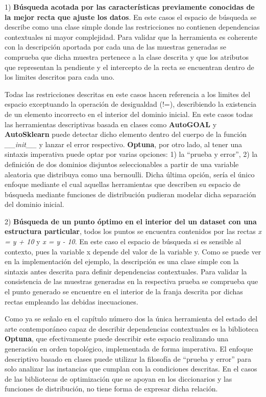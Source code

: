 1) {\bf Búsqueda acotada por las características previamente conocidas de la mejor recta que ajuste los
            datos}. En este casos el espacio de búsqueda se describe como una clase simple donde las restricciones
no contienen dependencias contextuales ni mayor complejidad. Para validar que la herramienta es
coherente con la descripción aportada por cada una de las muestras generadas se comprueba que dicha
muestra pertenece a la clase descrita y que los atributos que representan la pendiente y el intercepto
de la recta se encuentran dentro de los limites descritos para cada uno.

Todas las restricciones descritas en este casos hacen referencia a los limites del espacio exceptuando
la operación de desigualdad (!=), describiendo la existencia de un elemento incorrecto en el interior del
dominio inicial. En este casos todas las herramientas descriptivas basada en clases como {\bf AutoGOAL} y
      {\bf AutoSklearn} puede detectar dicho elemento dentro del cuerpo de la función {\it \_\_init\_\_} y lanzar el error
respectivo. {\bf Optuna}, por otro lado, al tener una sintaxis imperativa puede optar por varias opciones:
1) la ``prueba y error'', 2) la definición de dos dominios disjuntos seleccionables a partir de
una variable aleatoria que distribuya como una bernoulli. Dicha última opción, sería el único enfoque
mediante el cual aquellas herramientas que describen su espacio de búsqueda mediante funciones de
distribución pudieran modelar dicha separación del dominio inicial.


2) {\bf Búsqueda de un punto óptimo en el interior del un dataset con una estructura particular}, todos los
puntos se encuentra contenidos por las rectas {\it x = y + 10} y {\it x = y - 10}. En este caso el espacio de búsqueda
si es sensible al contexto, pues la variable x depende del valor de la variable y. Como se puede ver en la
implementación del ejemplo, la descripción es una clase simple con la sintaxis antes descrita para definir
dependencias contextuales. Para validar la consistencia de las muestras generadas en la respectiva prueba se
comprueba que el punto generado se encuentre en el interior de la franja descrita por dichas rectas empleando
las debidas inecuaciones.

Como ya se señalo en el capítulo número dos la única herramienta del estado del arte contemporáneo capaz de
describir dependencias contextuales es la biblioteca {\bf Optuna}, que efectivamente puede describir este espacio
realizando una generación en orden topológico, implementada de forma imperativa. El enfoque descriptivo basado en clases
puede utilizar la filosofía de ``prueba y error'' para solo analizar las instancias que cumplan con la condiciones
descritas. En el casos de las bibliotecas de optimización que se apoyan en los diccionarios y las funciones de
distribución, no tiene forma de expresar dicha relación.

